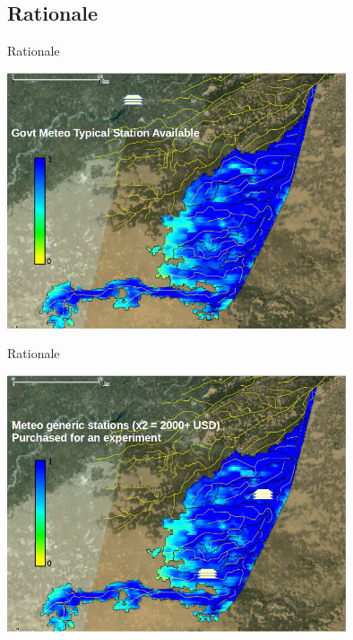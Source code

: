 \documentclass[xcolor=dvipsnames,beamer]{beamer} %
\begin{document}
\subsection{Rationale}
\begin{frame}[fragile]{Rationale}

\begin{center}
  \includegraphics[width=10cm]{MWS_v1_deltaT_rationale_0}
\end{center}

\end{frame}

\begin{frame}[fragile]{Rationale}

\begin{center}
  \includegraphics[width=10cm]{MWS_v1_deltaT_rationale_1}
\end{center}

\end{frame}
\end{document}
